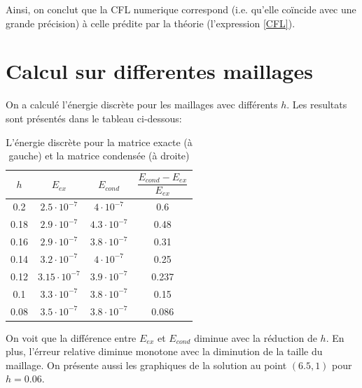 \documentclass[12pt]{article}
\begin{document}
Ainsi, on conclut que la CFL numerique correspond (i.e. qu'elle coïncide avec une grande précision) à celle prédite par la théorie (l'expression \eqref{CFL}).

\section{Calcul sur differentes maillages}
On a calculé l'énergie discrète pour les maillages avec différents $h$. Les resultats sont présentés dans le tableau ci-dessous:
	\begin{table}[H] 
	\begin{center}
		\begin{tabular}{|c|c|c|c|}
			\hline
			$h$ & $E_{ex}$ & $E_{cond}$ & $\dfrac{E_{cond} - E_{ex}}{E_{ex}}$\\
			\hline
			0.2 & $2.5 \cdot 10^{-7}$ & $4 \cdot 10^{-7}$ & 0.6 \\ 
			0.18 & $2.9 \cdot 10^{-7}$ & $4.3 \cdot 10^{-7}$ & 0.48 \\
			0.16 & $2.9 \cdot 10^{-7}$ & $3.8 \cdot 10^{-7}$ & 0.31\\
			0.14 & $3.2 \cdot 10^{-7}$ & $4 \cdot 10^{-7}$ & 0.25 \\
			0.12 & $3.15 \cdot 10^{-7}$ & $3.9 \cdot 10^{-7}$ & 0.237\\
			0.1 & $3.3 \cdot 10^{-7}$ & $3.8 \cdot 10^{-7}$  & 0.15\\
			0.08 & $3.5 \cdot 10^{-7}$ & $3.8 \cdot 10^{-7}$ & 0.086 \\
			\hline
		\end{tabular}
	\end{center}
\caption{\label{tab:energie} L'énergie discrète pour la matrice exacte (à gauche) et la matrice condensée (à droite)}
\end{table} 
\noindent On voit que la différence entre $E_{ex}$ et $E_{cond}$ diminue avec la réduction de $h$. En plus, l'érreur relative diminue monotone  avec la diminution de la taille du maillage. On présente aussi les graphiques de la solution au point $(6.5,1)$ pour $h=0.06$. 
\end{document}
